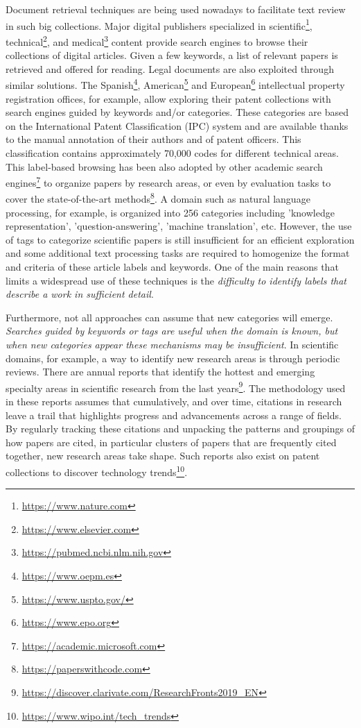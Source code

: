 Document retrieval techniques are being used nowadays to facilitate text review in such big collections. Major digital publishers specialized in scientific\footnote{\url{https://www.nature.com}}, technical\footnote{\url{https://www.elsevier.com}}, and medical\footnote{\url{https://pubmed.ncbi.nlm.nih.gov}} content provide search engines to browse their collections of digital articles. Given a few keywords, a list of relevant papers is retrieved and offered for reading. Legal documents are also exploited through similar solutions. The Spanish\footnote{\url{https://www.oepm.es}}, American\footnote{\url{https://www.uspto.gov/}} and European\footnote{\url{https://www.epo.org}} intellectual property registration offices, for example, allow exploring their patent collections with search engines guided by keywords and/or categories. These categories are based on the International Patent Classification (IPC) system and are available thanks to the manual annotation of their authors and of patent officers. This classification contains approximately 70,000 codes for different technical areas. This label-based browsing has been also adopted by other academic search engines\footnote{\url{https://academic.microsoft.com}} to organize papers by research areas, or even by evaluation tasks to cover the state-of-the-art methods\footnote{\url{https://paperswithcode.com}}. A domain such as natural language processing, for example, is organized into 256 categories including 'knowledge representation', 'question-answering', 'machine translation', etc. However, the use of tags to categorize scientific papers is still insufficient for an efficient exploration and some additional text processing tasks are required to homogenize the format and criteria of these article labels and keywords. One of the main reasons that limits a widespread use of these techniques is the \textit{difficulty to identify labels that describe a work in sufficient detail}.

Furthermore, not all approaches can assume that new categories will emerge. \textit{Searches guided by keywords or tags are useful when the domain is known, but when new categories appear these mechanisms may be insufficient}. In scientific domains, for example, a way to identify new research areas is through periodic reviews. There are annual reports that identify the hottest and emerging specialty areas in scientific research from the last years\footnote{\url{https://discover.clarivate.com/ResearchFronts2019_EN}}. The methodology used in these reports assumes that cumulatively, and over time, citations in research leave a trail that highlights progress and advancements across a range of fields. By regularly tracking these citations and unpacking the patterns and groupings of how papers are cited, in particular clusters of papers that are frequently cited together, new research areas take shape. Such reports also exist on patent collections to discover technology trends\footnote{\url{https://www.wipo.int/tech_trends}}.

